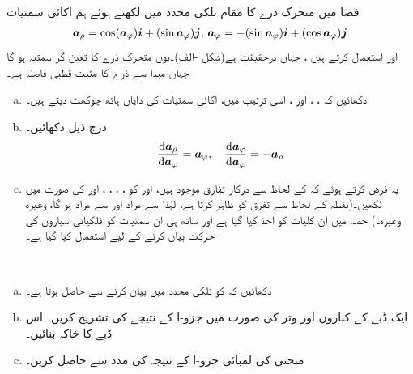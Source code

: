 فضا میں متحرک ذرے  کا مقام نلکی محدد میں لکھتے ہوئے ہم  اکائی سمتیات
\begin{align*}
{\boldsymbol{a}}_{\rho}=\cos({\boldsymbol{a}}_{\varphi}){\boldsymbol{i}}+(\sin{\boldsymbol{a}}_{\varphi}){\boldsymbol{j}},\,{\boldsymbol{a}}_{\varphi}=-(\sin{\boldsymbol{a}}_{\varphi}){\boldsymbol{i}}+(\cos{\boldsymbol{a}}_{\varphi}){\boldsymbol{j}}
\end{align*}
اور    استعمال کرتے ہیں ، جہاں  درحقیقت  ہے(شکل -الف)۔یوں  متحرک ذرے کا  تعین  گر سمتیہ   ہو گا جہاں  مبدا سے  ذرے کا مثبت قطبی فاصلہ ہے۔
\begin{enumerate}[a.]
\item
دکھائیں کہ ،  ، اور ، اسی ترتیب میں، اکائی سمتیات کی دایاں ہاتھ چوکھٹ  دیتے ہیں۔
\item
درج ذیل دکھائیں۔
\begin{align*}
\frac{\dif\arho}{\dif\avarphi}=\avarphi,\quad \frac{\dif\avarphi}{\dif \avarphi}=-\arho
\end{align*}
\item
یہ فرض کرتے ہوئے  کہ  کے لحاظ سے درکار تفارق موجود ہیں،  اور  کو ، ، ،  ، اور  کی صورت میں لکھیں۔(نقطہ  کے لحاظ سے تفرق کو ظاہر کرتا ہے، لہٰذا  سے مراد  اور  سے مراد  ہو گا، وغیرہ وغیرہ۔)  حصہ  میں ان کلیات کو اخذ کیا گیا ہے  اور ساتھ ہی ان سمتیات کو فلکیاتی سیاروں کی حرکت بیان کرنے کے لیے استعمال کیا گیا ہے۔
\end{enumerate}
\\
\begin{enumerate}[a.]
\item
دکھائیں کہ
   کو نلکی محدد میں بیان کرنے سے
  حاصل ہوتا ہے۔
\item
ایک ڈبے  کے کناروں اور وتر  کی صورت میں جزو-ا کے نتیجے کی تشریح کریں۔ اس ڈبے  کا خاکہ بنائیں۔
\item
منحنی
 \عددی{
\rho=e^{\varphi]},\, z=e^{\varphi},\, 0\le \varphi\le \ln 8
} 
کی لمبائی جزو-ا کے نتیجہ کی مدد  سے حاصل کریں۔
\end{enumerate}
